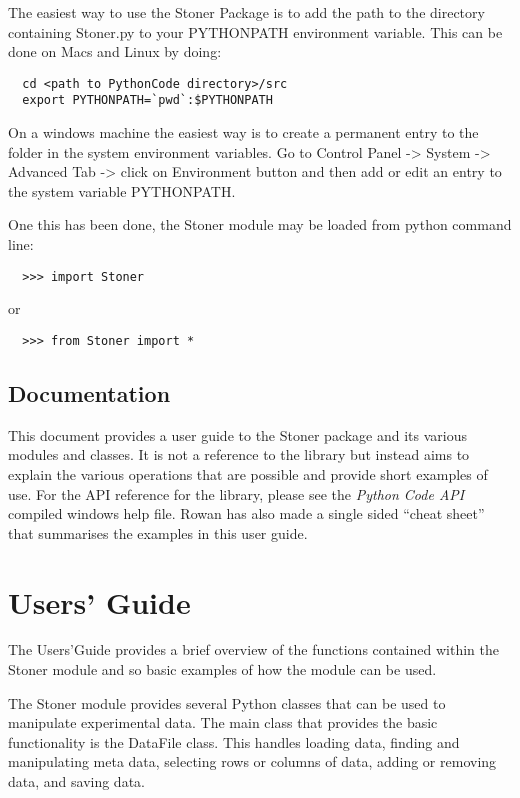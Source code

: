\documentclass[a4paper,11pt]{scrartcl}
\begin{document}
The easiest way to use the Stoner Package is to add the path to the directory
containing Stoner.py to your PYTHONPATH environment variable. This can be done
on Macs and Linux by doing:
\begin{verbatim}
  cd <path to PythonCode directory>/src
  export PYTHONPATH=`pwd`:$PYTHONPATH
\end{verbatim}
On a windows machine the easiest way is to create a permanent entry to the
folder in the system environment variables. Go to Control Panel -> System ->
Advanced Tab -> click on Environment button and then add or edit an entry to the
system variable PYTHONPATH.

One this has been done, the Stoner module may be loaded from python command
line:

\begin{verbatim}
  >>> import Stoner
\end{verbatim}

or

\begin{verbatim}
  >>> from Stoner import *
\end{verbatim}

\subsection{Documentation}

This document provides a user guide to the Stoner package and its various modules and classes. It is not a reference to the library but instead aims to explain the various operations that are possible and provide short examples of use. For the API reference for the library, please see the \textit{Python Code API} compiled windows help file. Rowan has also made a single sided ``cheat sheet'' that summarises the examples in this user guide.


\section{Users' Guide}

The Users'Guide provides a brief overview of the functions contained within the
Stoner module and so basic examples of how the module can be used.

The Stoner module provides several Python classes that can be used to manipulate
experimental data. The main class that provides the basic functionality is the
DataFile class. This handles loading data, finding and manipulating meta data,
selecting rows or columns of data, adding or removing data, and saving data.
\end{document}
